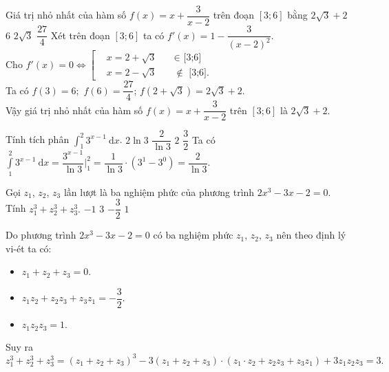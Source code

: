 \documentclass[12pt,a4paper,oneside]{book}
\newcommand{\hoac}[1]{ 
	\left[\begin{aligned}#1\end{aligned}\right.}
\begin{document}
\begin{ex}%
Giá trị nhỏ nhất của hàm số $ f(x)=x+\dfrac{3}{x-2} $	trên đoạn $ [3;6] $ bằng
	\choice
	{ \True $ 2\sqrt{3}+2 $}
	{$ 6 $}
	{$ 2\sqrt{3} $}
	{$ \dfrac{27}{4} $}
	\loigiai
	{Xét trên đoạn $ [3;6] $ ta có $ f'(x)=1-\dfrac{3}{(x-2)^2} $. \\
		Cho $ f'(x)=0 \Leftrightarrow \hoac{&x=2+\sqrt{3} &\quad \in \text{  [3;6]}\\&x=2-\sqrt{3} &\quad \notin \text{  [3;6]}.}$
\\ Ta có $ f\left(3\right) = 6; $	$ f(6)=\dfrac{27}{4} $; $ f\left(2+\sqrt{3}\right)=2\sqrt{3}+2. $\\
Vậy giá trị nhỏ nhất của hàm số $ f(x)=x+\dfrac{3}{x-2} $ trên $ [3;6] $ là $ 2\sqrt{3}+2 $.
}
\end{ex}
\begin{ex}%
Tính tích phân $ \displaystyle \int_{1}^{2} 3^{x-1} \mathrm{\ d}x $.
	\choice
	{ $ 2\ln 3 $}
	{\True $ \dfrac{2}{\ln 3} $}
	{$ 2 $}
	{$ \dfrac{3}{2} $}
	\loigiai
	{Ta có $ \displaystyle \int \limits_{1}^{2} 3^{x-1} \mathrm{\ d}x = \dfrac{3^{x-1}}{\ln 3} \bigg|_1^2 = \dfrac{1}{\ln 3} \cdot \left(3^1-3^0\right)= \dfrac{2}{\ln 3} $.
	}
\end{ex}
\begin{ex}%
Gọi $ z_1 $, $ z_2 $, $ z_3 $ lần lượt là ba nghiệm phức của phương trình $ 2x^3-3x-2=0 $. Tính $ z_1^3+z_2^3+z_3^3. $
	\choice
	{$ -1 $ }
	{\True $ 3 $}
	{$ -\dfrac{3}{2} $}
	{$ 1 $}
	\loigiai
	{Do phương trình $ 2x^3-3x-2=0 $ có ba nghiệm phức $ z_1 $, $ z_2 $, $ z_3 $ nên theo định lý vi-ét ta có:
		\begin{itemize}
			\item $ z_1+z_2+z_3=0 $.
			\item $ z_1 z_2 +z_2  z_3 + z_3  z_1 = -\dfrac{3}{2} $.
			\item $ z_1  z_2  z_3 = 1. $
		\end{itemize}
	Suy ra $ z_1^3+z_2^3+z_3^3 = \left(z_1+z_2+z_3\right)^3 - 3 \left(z_1+z_2+z_3\right)\cdot \left(z_1\cdot z_2 +z_2  z_3 + z_3  z_1\right) +3z_1  z_2  z_3 = 3.$
	}
\end{ex}
\end{document}
